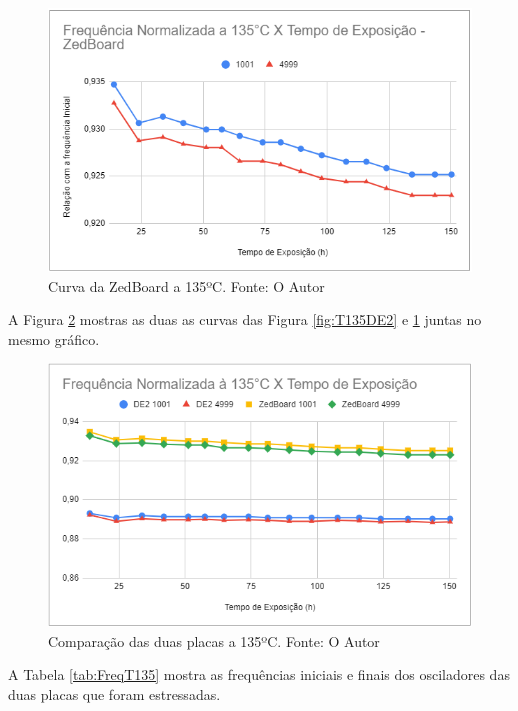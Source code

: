 \begin{figure}[H]
    \centering
    \includegraphics[scale=0.75]{figures/Resultados/T135ZedBoard}
    \caption{Curva da ZedBoard a 135ºC. Fonte: O Autor}
    \label{fig:T135ZedBoard}
\end{figure}

A Figura \ref{fig:T135Ambas} mostras as duas as curvas das Figura \ref{fig:T135DE2} e \ref{fig:T135ZedBoard} juntas no mesmo gráfico.

\begin{figure}[H]
    \centering
    \includegraphics[scale=0.75]{figures/Resultados/T135Ambas}
    \caption{Comparação das duas placas a 135ºC. Fonte: O Autor}
    \label{fig:T135Ambas}
\end{figure}

A Tabela \ref{tab:FreqT135} mostra as frequências iniciais e finais dos osciladores das duas placas que foram estressadas.


